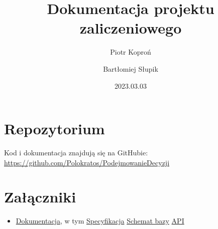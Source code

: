 \documentclass[12pt, a4paper]{article}
\author{Piotr Koproń \and Bartłomiej Słupik}
\date{2023.03.03}
\title{Dokumentacja projektu zaliczeniowego}
\begin{document}
    \section*{Repozytorium}
    Kod i dokumentacja znajdują się na GitHubie: \\ \href{https://github.com/Polokratos/PodejmowanieDecyzji}{https://github.com/Polokratos/PodejmowanieDecyzji}

    \section*{Załączniki}
    \begin{itemize}
        \item \href{https://github.com/Polokratos/PodejmowanieDecyzji/tree/main/docs}{Dokumentacja}, w tym
        \subitem \href{https://github.com/Polokratos/PodejmowanieDecyzji/blob/main/docs/specyfikacja.pdf}{Specyfikacja}
        \subitem \href{https://github.com/Polokratos/PodejmowanieDecyzji/blob/main/docs/db-diagram-vert.PNG}{Schemat bazy}
        \subitem \href{https://github.com/Polokratos/PodejmowanieDecyzji/blob/main/docs/api.json}{API}
    \end{itemize}
\end{document}

